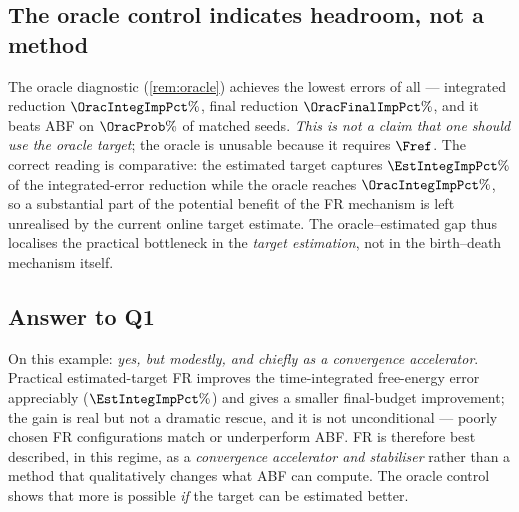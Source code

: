 \subsection{The oracle control indicates headroom, not a method}
The oracle diagnostic (\cref{rem:oracle}) achieves the lowest errors of all ---
integrated reduction $\OracIntegImpPct\%$, final reduction $\OracFinalImpPct\%$,
and it beats ABF on $\OracProb\%$ of matched seeds. \emph{This is not a claim
that one should use the oracle target}; the oracle is unusable because it
requires $\Fref$. The correct reading is comparative: the estimated target
captures $\EstIntegImpPct\%$ of the integrated-error reduction while the oracle
reaches $\OracIntegImpPct\%$, so a substantial part of the potential benefit of
the FR mechanism is left unrealised by the current online target estimate. The
oracle--estimated gap thus localises the practical bottleneck in the
\emph{target estimation}, not in the birth--death mechanism itself.

\subsection{Answer to Q1}
\label{sec:q1}
On this example: \emph{yes, but modestly, and chiefly as a convergence
accelerator}. Practical estimated-target FR improves the time-integrated
free-energy error appreciably ($\EstIntegImpPct\%$) and gives a smaller
final-budget improvement; the gain is real but not a dramatic rescue, and it is
not unconditional --- poorly chosen FR configurations match or underperform ABF.
FR is therefore best described, in this regime, as a \emph{convergence
accelerator and stabiliser} rather than a method that qualitatively changes what
ABF can compute. The oracle control shows that more is possible \emph{if} the
target can be estimated better.
